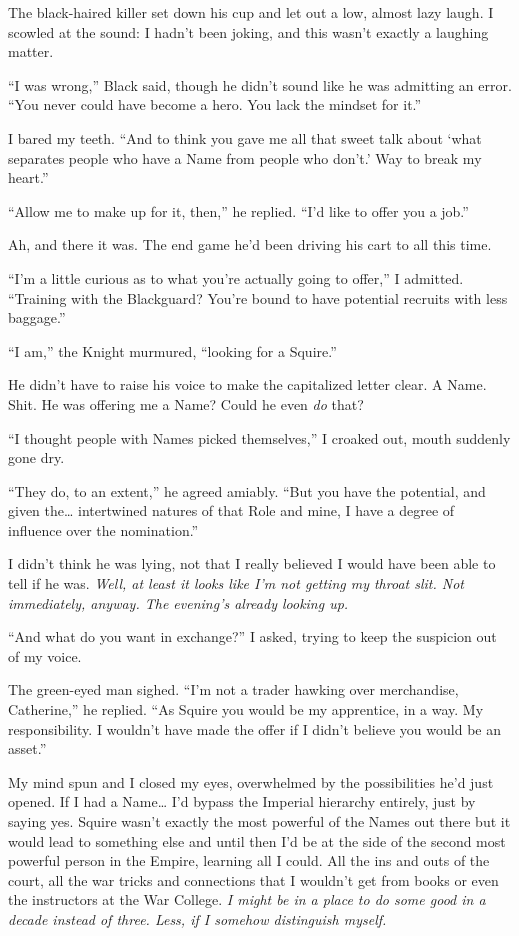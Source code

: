 \documentclass[12pt, openany]{book}
\begin{document}
The black-haired killer set down his cup and let out a low, almost lazy laugh. I scowled at the sound: I hadn’t been joking, and this wasn’t exactly a laughing matter.

“I was wrong,” Black said, though he didn’t sound like he was admitting an error. “You never could have become a hero. You lack the mindset for it.”

I bared my teeth. “And to think you gave me all that sweet talk about ‘what separates people who have a Name from people who don’t.’ Way to break my heart.”

“Allow me to make up for it, then,” he replied. “I’d like to offer you a job.”

Ah, and there it was. The end game he’d been driving his cart to all this time.

“I’m a little curious as to what you’re actually going to offer,” I admitted. “Training with the Blackguard? You’re bound to have potential recruits with less baggage.”

“I am,” the Knight murmured, “looking for a Squire.”

He didn’t have to raise his voice to make the capitalized letter clear. A Name. Shit. He was offering me a Name? Could he even \textit{do }that?

“I thought people with Names picked themselves,” I croaked out, mouth suddenly gone dry.

“They do, to an extent,” he agreed amiably. “But you have the potential, and given the… intertwined natures of that Role and mine, I have a degree of influence over the nomination.”

I didn’t think he was lying, not that I really believed I would have been able to tell if he was. \textit{Well, at least it looks like I’m not getting my throat slit. Not immediately, anyway. The evening’s already looking up.}

“And what do you want in exchange?” I asked, trying to keep the suspicion out of my voice.

The green-eyed man sighed. “I’m not a trader hawking over merchandise, Catherine,” he replied. “As Squire you would be my apprentice, in a way. My responsibility. I wouldn’t have made the offer if I didn’t believe you would be an asset.”

My mind spun and I closed my eyes, overwhelmed by the possibilities he’d just opened. If I had a Name… I’d bypass the Imperial hierarchy entirely, just by saying yes. Squire wasn’t exactly the most powerful of the Names out there but it would lead to something else and until then I’d be at the side of the second most powerful person in the Empire, learning all I could. All the ins and outs of the court, all the war tricks and connections that I wouldn’t get from books or even the instructors at the War College. \textit{I might be in a place to do some good in a decade instead of three. Less, if I somehow distinguish myself.}
\end{document}
